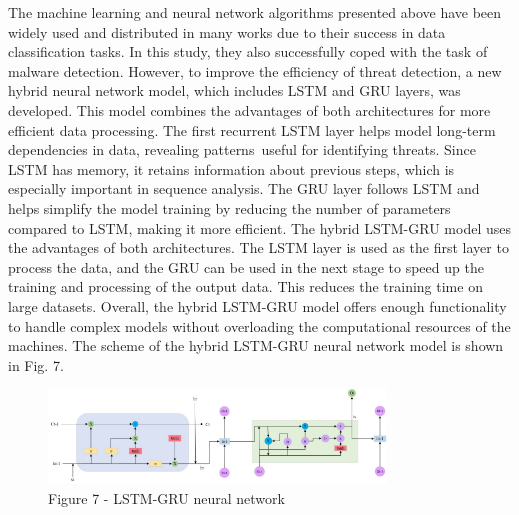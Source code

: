 \begin{multicols}{2}
The machine learning and neural network algorithms presented above have
been widely used and distributed in many works due to their success in
data classification tasks. In this study, they also successfully coped
with the task of malware detection. However, to improve the efficiency
of threat detection, a new hybrid neural network model, which includes
LSTM and GRU layers, was developed. This model combines the advantages
of both architectures for more efficient data processing. The first
recurrent LSTM layer helps model long-term dependencies in data,
revealing patterns~useful for identifying threats. Since LSTM has
memory, it retains information about previous steps, which is especially
important in sequence analysis. The GRU layer follows LSTM and helps
simplify the model training by reducing the number of parameters
compared to LSTM, making it more efficient. The hybrid LSTM-GRU model
uses the advantages of both architectures. The LSTM layer is used as the
first layer to process the data, and the GRU can be used in the next
stage to speed up the training and processing of the output data. This
reduces the training time on large datasets. Overall, the hybrid
LSTM-GRU model offers enough functionality to handle complex models
without overloading the computational resources of the machines. The
scheme of the hybrid LSTM-GRU neural network model is shown in Fig. 7.
\end{multicols}

\begin{figure}[H]
	\centering
	\includegraphics[width=0.8\textwidth]{media/ict/image80}
	\caption*{Figure 7 - LSTM-GRU neural network}
\end{figure}

